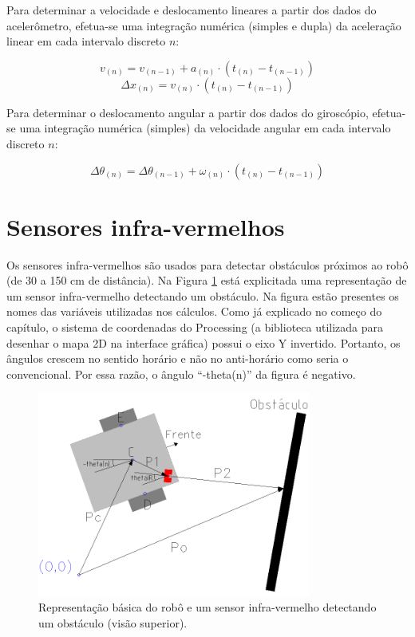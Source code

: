 Para determinar a velocidade e deslocamento lineares a partir dos dados do acelerômetro, efetua-se uma integração numérica (simples e dupla) da aceleração linear em cada intervalo discreto $n$:

\begin{equation}
  v_{(n)} = v_{(n - 1)} + a_{(n)} \cdot (t_{(n)} - t_{(n-1)})
  \label{eq:v_acelerometro}
\end{equation}
\begin{equation}
  \Delta x_{(n)} = v_{(n)} \cdot (t_{(n)} - t_{(n-1)})
  \label{eq:x_acelerometro}
\end{equation}

Para determinar o deslocamento angular a partir dos dados do giroscópio, efetua-se uma integração numérica (simples) da velocidade angular em cada intervalo discreto $n$:

\begin{equation}
  \Delta \theta_{(n)} = \Delta \theta_{(n - 1)} + \omega_{(n)} \cdot (t_{(n)} - t_{(n-1)})
  \label{eq:theta_giroscopio}
\end{equation}



\section{Sensores infra-vermelhos}

Os sensores infra-vermelhos são usados para detectar obstáculos próximos ao robô (de 30 a 150 cm de distância). Na Figura \ref{fig:robo_ir} está explicitada uma representação de um sensor infra-vermelho detectando um obstáculo. Na figura estão presentes os nomes das variáveis utilizadas nos cálculos. Como já explicado no começo do capítulo, o sistema de coordenadas do Processing (a biblioteca utilizada para desenhar o mapa 2D na interface gráfica) possui o eixo Y invertido. Portanto, os ângulos crescem no sentido horário e não no anti-horário como seria o convencional. Por essa razão, o ângulo ``-theta(n)'' da figura é negativo. 

\begin{figure}[H]
  \centering
  \includegraphics[width=0.8\textwidth, keepaspectratio]{./figuras/robo/robo_ir.png}
  \caption{Representação básica do robô e um sensor infra-vermelho detectando um obstáculo (visão superior).}
  \label{fig:robo_ir}
\end{figure}

